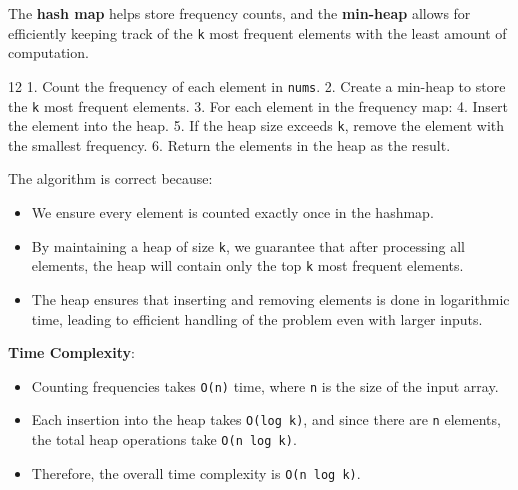 The \textbf{hash map} helps store frequency counts, and the \textbf{min-heap} allows for efficiently keeping track of the \texttt{k} most frequent elements with the least amount of computation.

\Algorithm
\begin{CodeBlock}[style=pseudo,caption={Pseudocode for Top K Frequent Elements}]{12}
1. Count the frequency of each element in \texttt{nums}.
2. Create a min-heap to store the \texttt{k} most frequent elements.
3. For each element in the frequency map:
    4. Insert the element into the heap.
    5. If the heap size exceeds \texttt{k}, remove the element with the smallest frequency.
6. Return the elements in the heap as the result.
\end{CodeBlock}

\Correctness
The algorithm is correct because:
\begin{itemize}
    \item We ensure every element is counted exactly once in the hashmap.
    \item By maintaining a heap of size \texttt{k}, we guarantee that after processing all elements, the heap will contain only the top \texttt{k} most frequent elements.
    \item The heap ensures that inserting and removing elements is done in logarithmic time, leading to efficient handling of the problem even with larger inputs.
\end{itemize}

\Complexity
\textbf{Time Complexity}: 
\begin{itemize}
    \item Counting frequencies takes \texttt{O(n)} time, where \texttt{n} is the size of the input array.
    \item Each insertion into the heap takes \texttt{O(log k)}, and since there are \texttt{n} elements, the total heap operations take \texttt{O(n log k)}.
    \item Therefore, the overall time complexity is \texttt{O(n log k)}.
\end{itemize}

